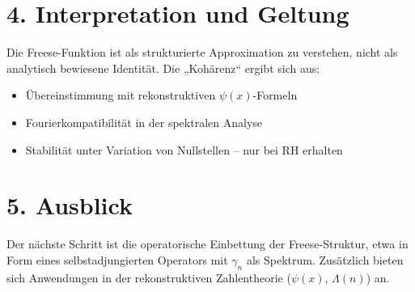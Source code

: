 \documentclass[12pt]{article}
\begin{document}
\section*{4. Interpretation und Geltung}

Die Freese-Funktion ist als strukturierte Approximation zu verstehen, nicht als analytisch bewiesene Identität.  
Die „Kohärenz“ ergibt sich aus:

\begin{itemize}
  \item Übereinstimmung mit rekonstruktiven \( \psi(x) \)-Formeln
  \item Fourierkompatibilität in der spektralen Analyse
  \item Stabilität unter Variation von Nullstellen – nur bei RH erhalten
\end{itemize}

\section*{5. Ausblick}

Der nächste Schritt ist die operatorische Einbettung der Freese-Struktur, etwa in Form eines selbstadjungierten Operators mit \( \gamma_n \) als Spektrum.  
Zusätzlich bieten sich Anwendungen in der rekonstruktiven Zahlentheorie (\(\psi(x)\), \(\Lambda(n)\)) an.
\end{document}
